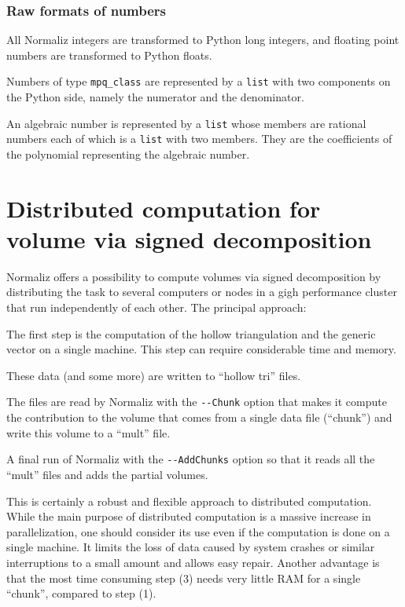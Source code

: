 \begin{small}
\subsubsection{Raw formats of numbers}

All Normaliz integers are transformed to Python long integers, and floating point numbers are transformed to Python floats.

Numbers of type \verb|mpq_class| are represented by a \verb|list| with two components on the Python side, namely the numerator and the denominator.

An algebraic number is represented by a \verb|list| whose members are rational numbers each of which is a \verb|list| with two members. They are the coefficients of the polynomial representing the algebraic number.

\end{small}

\section{Distributed computation for volume via signed decomposition}\label{distr_comp}

Normaliz offers a possibility to compute volumes via signed decomposition by distributing the task to several computers or nodes in a gigh performance cluster that run independently of each other. The principal approach:
\begin{arab}
\item The first step is the computation of the hollow triangulation and the generic vector on a single machine. This step can require considerable time and memory.
\item These data (and some more) are written to ``hollow tri'' files.
\item The files are read by Normaliz with the \verb|--Chunk| option that makes it compute the contribution to the volume that comes from a single data file (``chunk'') and write this volume to a ``mult''  file.
\item A final run of Normaliz with the \verb|--AddChunks| option so that it reads all the ``mult'' files and adds the partial volumes.
\end{arab}

This is certainly a  robust and flexible approach to distributed computation. While the main purpose of distributed computation is a massive increase in parallelization, one should consider its use even if the computation is done on a single machine. It limits the loss of data caused by system crashes or similar interruptions to a small amount and allows easy repair. Another advantage is that the most time consuming step (3) needs very little RAM for a single ``chunk'', compared to step (1). 

